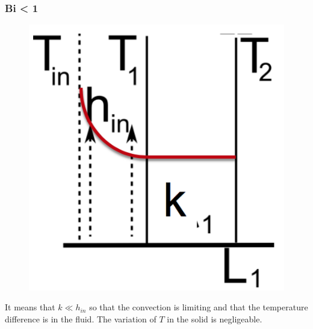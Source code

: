  			\subsubsection{Bi < 1}
	 			\begin{figure}
 				\vspace{-5mm}
 				\includegraphics[scale=0.35]{ch3/8}
 				\end{figure}
 			It means that $k \ll h_{in}$ so that the convection is limiting and that the temperature difference is in the fluid. The variation of $T$ in the solid is negligeable.\\\\
 			
